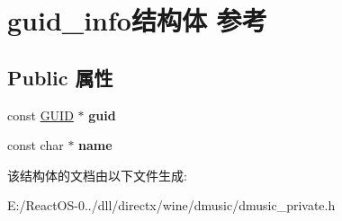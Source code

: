 \hypertarget{structguid__info}{}\section{guid\+\_\+info结构体 参考}
\label{structguid__info}
\subsection*{Public 属性}
\begin{DoxyCompactItemize}
\item 
\mbox{\label{structguid__info_aaa30bd93e94834d4ff7b92d8be177892}} 
const \hyperlink{interface_g_u_i_d}{G\+U\+ID} $\ast$ {\bfseries guid}
\item 
\mbox{\label{structguid__info_afb5060e4b054c421f3b94cd75dddf6ce}} 
const char $\ast$ {\bfseries name}
\end{DoxyCompactItemize}


该结构体的文档由以下文件生成\+:\begin{DoxyCompactItemize}
\item 
E\+:/\+React\+O\+S-\/0../dll/directx/wine/dmusic/dmusic\+\_\+private.\+h\end{DoxyCompactItemize}
